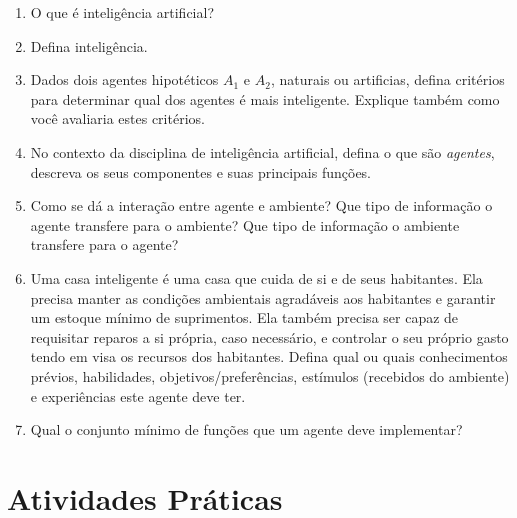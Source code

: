 \documentclass{article}
\begin{document}
\begin{enumerate}
\item O que é inteligência artificial?

\item Defina inteligência.

\item Dados dois agentes hipotéticos $A_1$ e $A_2$, naturais ou artificias, defina critérios para determinar qual dos agentes é mais inteligente. Explique também como você avaliaria estes critérios.

\item No contexto da disciplina de inteligência artificial, defina o que são \textit{agentes}, descreva os seus componentes e suas principais funções.

\item Como se dá a interação entre agente e ambiente? Que tipo de informação o agente transfere para o ambiente? Que tipo de informação o ambiente transfere para o agente?


\item Uma casa inteligente é uma casa que cuida de si e de seus habitantes. Ela precisa manter as condições ambientais agradáveis aos habitantes e garantir um estoque mínimo de suprimentos. Ela também precisa ser capaz de requisitar reparos a si própria, caso necessário, e controlar o seu próprio gasto tendo em visa os recursos dos habitantes. Defina qual ou quais conhecimentos prévios, habilidades, objetivos/preferências, estímulos (recebidos do ambiente) e experiências este agente deve ter.  

\item Qual o conjunto mínimo de funções que um agente deve implementar?


\end{enumerate}


\section{Atividades Práticas}
\end{document}
